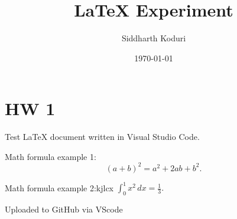 \documentclass{article}
\title{LaTeX Experiment}
\author{Siddharth Koduri}
\date{\today}
\begin{document}
\maketitle

\section{HW 1}

Test LaTeX document written in Visual Studio Code.

Math formula example 1:
\[
(a+b)^2 = a^2 + 2ab + b^2.
\]

Math formula example 2:kjlcx
$\int_0^1 x^2 \, dx = \frac{1}{3}.$

Uploaded to GitHub via VScode
\end{document}
